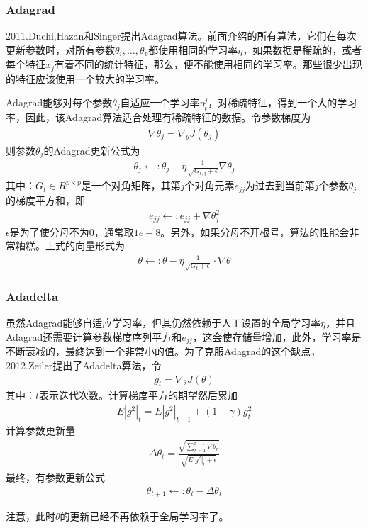         \subsubsection{Adagrad}
            2011.Duchi,Hazan和Singer\cite{2011.Duchi}提出Adagrad算法。前面介绍的所有算法，它们在每次更新参数时，对所有参数$\theta_i,\dots,\theta_p$都使用相同的学习率$\eta$，如果数据是稀疏的，或者每个特征$x_j$有着不同的统计特征，那么，便不能使用相同的学习率。那些很少出现的特征应该使用一个较大的学习率。
            \par
            Adagrad能够对每个参数$\theta_j$自适应一个学习率$\eta_t^j$，对稀疏特征，得到一个大的学习率，因此，该Adagrad算法适合处理有稀疏特征的数据。令参数梯度为
            \begin{align*}
            \nabla\theta_j = \nabla_\theta J(\theta_j)
            \end{align*}
            则参数$\theta_j$的Adagrad更新公式为
            \begin{align*}
            \theta_j\leftarrow : \theta_j - \eta\frac{1}{\sqrt{G_{t,j}+\epsilon}}\nabla\theta_j
            \end{align*}
            其中：$G_t\in R^{p\times p}$是一个对角矩阵，其第$j$个对角元素$e_{jj}$为过去到当前第$j$个参数$\theta_j$的梯度平方和，即
            \begin{align*}
            e_{jj} \leftarrow: e_{jj} + \nabla \theta_j^2
            \end{align*}
            $\epsilon$是为了使分母不为0，通常取$1e-8$。另外，如果分母不开根号，算法的性能会非常糟糕。上式的向量形式为
            \begin{align*}
            \theta \leftarrow :\theta - \eta \frac{1}{\sqrt{G_t+\epsilon}} \cdot \nabla \theta
            \end{align*}
        \subsubsection{Adadelta}
            虽然Adagrad能够自适应学习率，但其仍然依赖于人工设置的全局学习率$\eta$，并且Adagrad还需要计算参数梯度序列平方和$e_{jj}$，这会使存储量增加，此外，学习率是不断衰减的，最终达到一个非常小的值。为了克服Adagrad的这个缺点，2012.Zeiler\cite{2012.Zeiler}提出了Adadelta算法，令
            \begin{align*}
            g_t = \nabla _\theta J(\theta)
            \end{align*}
            其中：$t$表示迭代次数。计算梯度平方的期望然后累加
            \begin{align*}
            E|g^2|_t = E|g^2|_{t-1}+(1-\gamma) g_t^2
            \end{align*}
            计算参数更新量
            \begin{align*}
            \Delta \theta_t = \frac{\sqrt{\sum_{r = 1}^{t-1}\nabla \theta_r}}{\sqrt{E|g^2|_t+\epsilon}}
            \end{align*}
            最终，有参数更新公式
            \begin{align*}
            \theta_{t+1}\leftarrow:\theta_t -\Delta\theta_t
            \end{align*}
            \par
            注意，此时$\theta$的更新已经不再依赖于全局学习率了。

